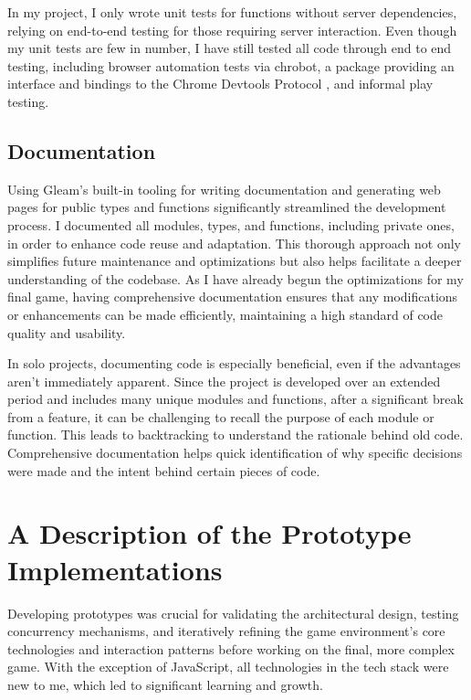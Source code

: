 \documentclass[]{interim}
\begin{document}
In my project, I only wrote unit tests for functions without server
dependencies, relying on end-to-end testing for those requiring server interaction.
Even though my unit tests are few in number, I have still tested all code through
end to end testing, including browser automation tests via chrobot, a package providing
an interface and bindings to the Chrome Devtools Protocol \cite{noauthor_chrobot_nodate},
and informal play testing.

\section{Documentation}
Using Gleam's built-in tooling for writing documentation and generating web pages
for public types and functions significantly streamlined the development process.
I documented all modules, types, and functions, including private ones,
in order to enhance code reuse and adaptation. This thorough approach not
only simplifies future maintenance and optimizations but also helps facilitate a
deeper understanding of the codebase. As I have already begun the
optimizations for my final game, having comprehensive documentation
ensures that any modifications or enhancements can be made efficiently,
maintaining a high standard of code quality and usability.

In solo projects, documenting code is especially beneficial, even if the advantages
aren't immediately apparent. Since the project is developed over an extended period
and includes many unique modules and functions, after a significant break from a
feature, it can be challenging to recall the purpose of each module or function.
This leads to backtracking to understand the rationale behind old code.
Comprehensive documentation helps quick identification of why specific decisions
were made and the intent behind certain pieces of code.

\chapter{A Description of the Prototype Implementations}

Developing prototypes was crucial for validating the architectural design,
testing concurrency mechanisms, and iteratively refining the game environment's
core technologies and interaction patterns before working on the final,
more complex game. With the exception of JavaScript,
all technologies in the tech stack were new to me, which led to
significant learning and growth.
\end{document}
